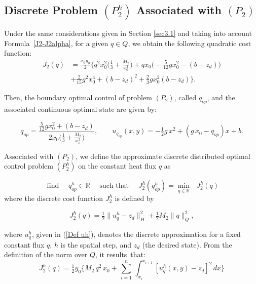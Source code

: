 \documentclass[axioms,article,submit,moreauthors]{Definitions/mdpi}
\begin{document}
\subsection{Discrete Problem  ${(P^h_2)}$ Associated with $(P_2)$} 

Under the same considerations given in Section \ref{sec3.1} and taking into account Formula~\eqref{J2-J2alpha}, for a given $q \in Q$, we obtain the following quadratic cost function:
        \begin{equation}\label{J2}
        \begin{array}{ll}
        J_2(q)&=\tfrac{x_0 y_0}{2}\Big\{ q^2 x_0^2 \Big(\tfrac{1}{3} +\tfrac{M_2}{x_0^3}\Big)+q x_0 \Big(-\tfrac{5}{12} g x_0^2-  (b-z_d)\Big)  \\[0.5cm]
       &+\tfrac{2}{15} g^2 x_0^4 +  (b-z_d)^2+\tfrac{2}{3} g x_0^2 (b-z_d) \Big\}.
\end{array}       
       \end{equation}

  \noindent Then, the boundary optimal control of problem $(P_2)$, called $q_{op}$, and the associated continuous optimal state
  are given by:
 
      \begin{equation}\label{ec 4.2}
          q_{op}=\frac{\tfrac{5}{12} g x_0^2+ (b-z_d)}{2 x_0 \big(\tfrac{1}{3}+\tfrac{M_2}{x_0^3}\big)},\qquad u_{q_{op}}(x,y) = -\tfrac{1}{2} g\, x^2 + (g\, x_0 - q_{op}) x +b.
       \end{equation}

      

Associated with $(P_2)$, we define  the approximate discrete distributed optimal control problem ${(P^h_2)}$ on the constant heat flux $q$ as

\[ \text{ find }\quad {q^h_{op}}\in \mathbb{R}\quad\text{ such that }\quad
{J^h_2}({q^h_{op}})=\min\limits_{q\in \mathbb{R}} \text{ }{J^h_2}(q)
\]
where the  discrete cost function ${J^h_2}$ is defined by
    
     \[{J^h_2} (q)=  \tfrac{1}{2} \lVert {u^h_q} - z_d \rVert^2_H +  \tfrac{1}{2} M_2 \lVert q \rVert ^2_Q ,\]
     
 \noindent where ${u^h_q}$, given in (\ref{Def uh}), {denotes the discrete approximation for a fixed constant flux $q$}, $h$ is the spatial step, and $z_d$ (the desired state).
 From the definition of the norm over $Q$, it results~that:   
    \[{J^h_2} (q)= \tfrac{1}{2} y_0 \Big\{M_2\,q^2 \,x_0 + \, \sum_{i=1}^n \, \int_{x_i}^{x_{i+1}} [{u^h_q} (x,y) - z_d]^2 \,dx \Big \}\]
     
\end{document}
